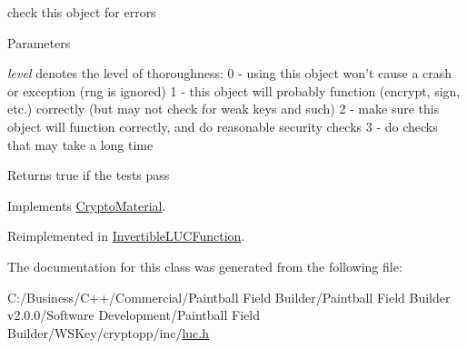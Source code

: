 check this object for errors 
\begin{DoxyParams}{Parameters}
\item[{\em level}]denotes the level of thoroughness: 0 -\/ using this object won't cause a crash or exception (rng is ignored) 1 -\/ this object will probably function (encrypt, sign, etc.) correctly (but may not check for weak keys and such) 2 -\/ make sure this object will function correctly, and do reasonable security checks 3 -\/ do checks that may take a long time \end{DoxyParams}
\begin{DoxyReturn}{Returns}
true if the tests pass 
\end{DoxyReturn}


Implements \hyperlink{class_crypto_material_aaa7d67d0c12712de0e33713c73f5b718}{CryptoMaterial}.

Reimplemented in \hyperlink{class_invertible_l_u_c_function_ad6390a95a003eceef45cc238f538c4d8}{InvertibleLUCFunction}.

The documentation for this class was generated from the following file:\begin{DoxyCompactItemize}
\item 
C:/Business/C++/Commercial/Paintball Field Builder/Paintball Field Builder v2.0.0/Software Development/Paintball Field Builder/WSKey/cryptopp/inc/\hyperlink{luc_8h}{luc.h}\end{DoxyCompactItemize}
